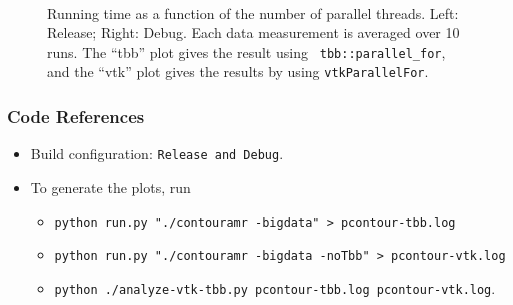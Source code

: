 \documentclass{article}
\begin{document}
\begin{figure}[H]
\centering \mbox{
  \quad {}
}
\caption{Running time as a function of the number of parallel
  threads. Left: Release; Right: Debug. Each data measurement is
  averaged over 10 runs. The ``tbb'' plot gives the result using {\tt
    tbb::parallel\_for}, and the ``vtk'' plot gives the results by
  using {\tt vtkParallelFor}. }
\label{fig:flash}
\end{figure}

\subsubsection*{Code References}
\begin{itemize}
\item Build configuration: {\tt Release and Debug}.
\item To generate the plots, run
\begin{itemize}
\item {\tt python run.py "./contouramr -bigdata" > pcontour-tbb.log}
\item {\tt python run.py "./contouramr -bigdata -noTbb" > pcontour-vtk.log}
\item  {\tt python ./analyze-vtk-tbb.py pcontour-tbb.log pcontour-vtk.log}.
\end{itemize}

\end{itemize}
\end{document}
